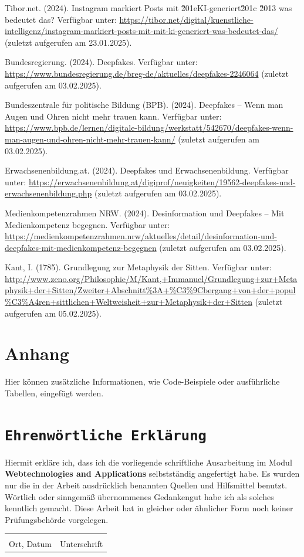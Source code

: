 \documentclass[a4paper,12pt]{article}
\begin{document}
\begin{thebibliography}{99}
     Tibor.net. (2024). Instagram markiert Posts mit \u201eKI-generiert\u201c \u2013 was bedeutet das? 
    Verfügbar unter: \url{https://tibor.net/digital/kuenstliche-intelligenz/instagram-markiert-posts-mit-mit-ki-generiert-was-bedeutet-das/} (zuletzt aufgerufen am 23.01.2025).
    
     Bundesregierung. (2024). Deepfakes. 
    Verfügbar unter: \url{https://www.bundesregierung.de/breg-de/aktuelles/deepfakes-2246064} (zuletzt aufgerufen am 03.02.2025).
    
     Bundeszentrale für politische Bildung (BPB). (2024). Deepfakes – Wenn man Augen und Ohren nicht mehr trauen kann. 
    Verfügbar unter: \url{https://www.bpb.de/lernen/digitale-bildung/werkstatt/542670/deepfakes-wenn-man-augen-und-ohren-nicht-mehr-trauen-kann/} (zuletzt aufgerufen am 03.02.2025).
    
     Erwachsenenbildung.at. (2024). Deepfakes und Erwachsenenbildung. 
    Verfügbar unter: \url{https://erwachsenenbildung.at/digiprof/neuigkeiten/19562-deepfakes-und-erwachsenenbildung.php} (zuletzt aufgerufen am 03.02.2025).
    
     Medienkompetenzrahmen NRW. (2024). Desinformation und Deepfakes – Mit Medienkompetenz begegnen. 
    Verfügbar unter: \url{https://medienkompetenzrahmen.nrw/aktuelles/detail/desinformation-und-deepfakes-mit-medienkompetenz-begegnen} (zuletzt aufgerufen am 03.02.2025).
    
     Kant, I. (1785). Grundlegung zur Metaphysik der Sitten.  
    Verfügbar unter: \url{http://www.zeno.org/Philosophie/M/Kant,+Immanuel/Grundlegung+zur+Metaphysik+der+Sitten/Zweiter+Abschnitt%3A+%C3%9Cbergang+von+der+popul%C3%A4ren+sittlichen+Weltweisheit+zur+Metaphysik+der+Sitten} (zuletzt aufgerufen am 05.02.2025).  

\end{thebibliography}
\newpage
\appendix
\section{Anhang}
Hier können zusätzliche Informationen, wie Code-Beispiele oder ausführliche Tabellen, eingefügt werden.

\newpage
{}
\section*{\texttt{Ehrenwörtliche Erklärung}}
Hiermit erkläre ich, dass ich die vorliegende schriftliche Ausarbeitung im Modul \textbf{Webtechnologies and Applications} selbstständig
angefertigt habe. Es wurden nur die in der Arbeit ausdrücklich benannten Quellen und
Hilfsmittel benutzt. Wörtlich oder sinngemäß übernommenes Gedankengut habe ich als
solches kenntlich gemacht. Diese Arbeit hat in gleicher oder ähnlicher Form noch keiner
Prüfungsbehörde vorgelegen.

\vspace{3cm}
\noindent\begin{tabular}{p{}p{}}
    \hrulefill & \hrulefill \\
    Ort, Datum & Unterschrift \\
\end{tabular}
\end{document}
